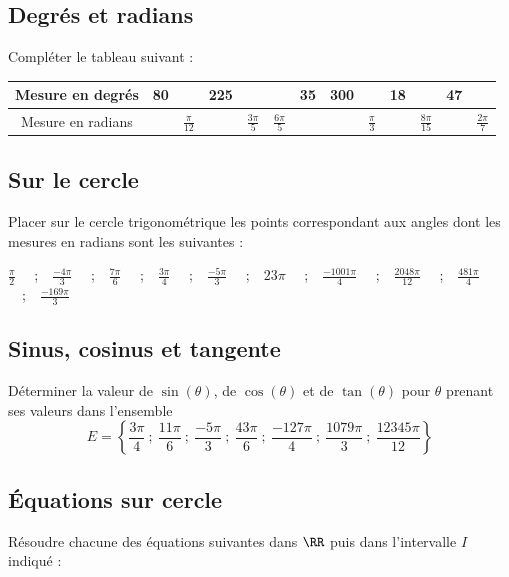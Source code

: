 \documentclass[oneside,12pt]{book}          %
\begin{document}
\subsection{Degrés et radians}

Compléter le tableau suivant :

\begin{center}
\renewcommand{\arraystretch}{2}
\begin{tabular}{|c|C|C|C|C|C|C|C|C|C|C|C|C|} \hline
    Mesure en degrés & 80 & & 225 & & & 35 & 300 & & 18 & & 47 &  \\ \hline
    Mesure en radians & & $\frac{\pi}{12}$ & &$\frac{3\pi}{5}$ & $\frac{6\pi}{5}$ & & & $\frac{\pi}{3}$ & & $\frac{8\pi}{15}$ & & $\frac{2\pi}{7}$ \\ \hline
\end{tabular}
\end{center}


\subsection{Sur le cercle}

Placer sur le cercle trigonométrique les points correspondant aux angles dont les mesures en radians sont les suivantes : 
\begin{center}
    \large $\frac{\pi}{2}$ ~~;~~$\frac{-4\pi}{3}$ ~~;~~$\frac{7\pi}{6}$ ~~;~~$\frac{3\pi}{4}$ ~~;~~$\frac{-5\pi}{3}$ ~~;~~$23\pi$ ~~;~~$\frac{-1001\pi}{4}$ ~~;~~$\frac{2048\pi}{12}$ ~~;~~$\frac{481\pi}{4}$ ~~;~~$\frac{-169\pi}{3}$
\end{center}



\subsection{Sinus, cosinus et tangente}
Déterminer la valeur de $\sin(\theta)$, de $\cos(\theta)$ et de $\tan(\theta)$ pour $\theta$ prenant ses valeurs dans l'ensemble
\[ E=\left\{ \dfrac{3\pi}{4} ~;~ \dfrac{11\pi}{6} ~;~ \dfrac{-5\pi}{3} ~;~ \dfrac{43\pi}{6} ~;~ \dfrac{-127\pi}{4} ~;~ \dfrac{1079\pi}{3} ~;~ \dfrac{12345\pi}{12} \right\} \]


\subsection{Équations sur cercle}
Résoudre chacune des équations suivantes dans $\RR$ puis dans l'intervalle $I$ indiqué :
\end{document}
